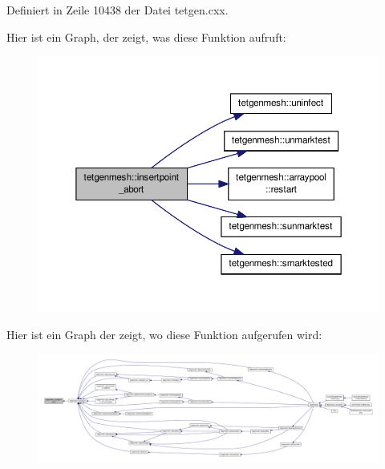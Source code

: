 Definiert in Zeile 10438 der Datei tetgen.\-cxx.



Hier ist ein Graph, der zeigt, was diese Funktion aufruft\-:
\nopagebreak
\begin{figure}[H]
\begin{center}
\leavevmode
\includegraphics[width=350pt]{classtetgenmesh_ac7173aaaeb5600daa685af9c2c718834_cgraph}
\end{center}
\end{figure}




Hier ist ein Graph der zeigt, wo diese Funktion aufgerufen wird\-:
\nopagebreak
\begin{figure}[H]
\begin{center}
\leavevmode
\includegraphics[width=350pt]{classtetgenmesh_ac7173aaaeb5600daa685af9c2c718834_icgraph}
\end{center}
\end{figure}


